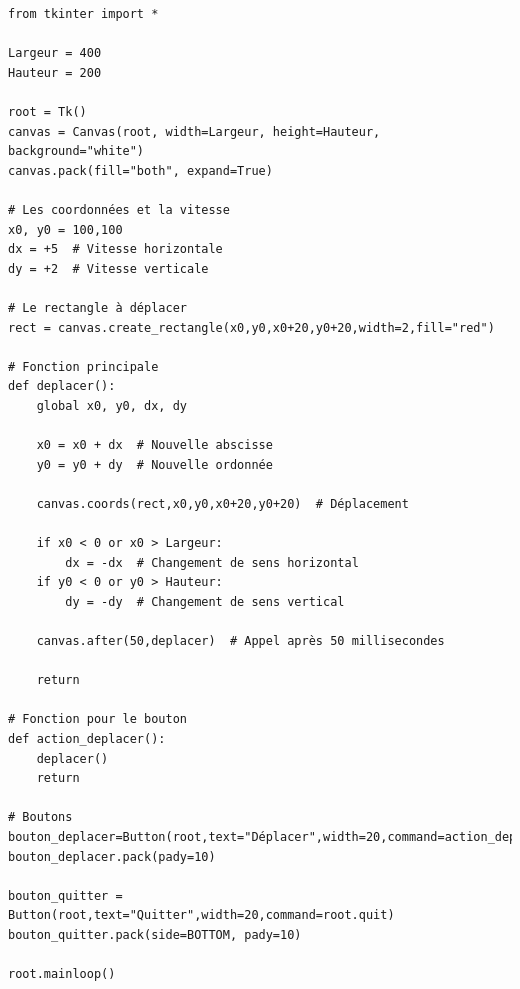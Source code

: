 \documentclass[11pt,class=report,crop=false]{standalone}
\begin{document}
\begin{lstlisting}
from tkinter import *

Largeur = 400
Hauteur = 200

root = Tk()     
canvas = Canvas(root, width=Largeur, height=Hauteur, background="white")
canvas.pack(fill="both", expand=True)

# Les coordonnées et la vitesse
x0, y0 = 100,100
dx = +5  # Vitesse horizontale
dy = +2  # Vitesse verticale

# Le rectangle à déplacer
rect = canvas.create_rectangle(x0,y0,x0+20,y0+20,width=2,fill="red")

# Fonction principale
def deplacer():
    global x0, y0, dx, dy

    x0 = x0 + dx  # Nouvelle abscisse
    y0 = y0 + dy  # Nouvelle ordonnée

    canvas.coords(rect,x0,y0,x0+20,y0+20)  # Déplacement

    if x0 < 0 or x0 > Largeur:
        dx = -dx  # Changement de sens horizontal
    if y0 < 0 or y0 > Hauteur:
        dy = -dy  # Changement de sens vertical

    canvas.after(50,deplacer)  # Appel après 50 millisecondes
 
    return
    
# Fonction pour le bouton
def action_deplacer():
    deplacer()
    return

# Boutons
bouton_deplacer=Button(root,text="Déplacer",width=20,command=action_deplacer)
bouton_deplacer.pack(pady=10)

bouton_quitter = Button(root,text="Quitter",width=20,command=root.quit)
bouton_quitter.pack(side=BOTTOM, pady=10)

root.mainloop()
\end{lstlisting}
\end{document}
